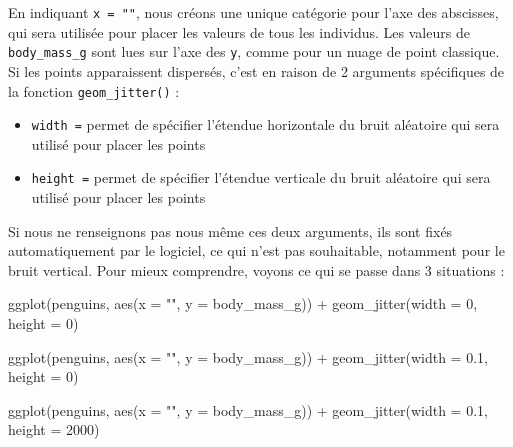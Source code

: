 \documentclass[
  a4paper,
  DIV=11,
  numbers=noendperiod,
  oneside]{scrreprt}
\newenvironment{Shaded}{}{}
\newcommand{\AttributeTok}[1]{\textcolor[rgb]{0.84,0.23,0.29}{#1}}
\newcommand{\DecValTok}[1]{\textcolor[rgb]{0.00,0.36,0.77}{#1}}
\newcommand{\FloatTok}[1]{\textcolor[rgb]{0.00,0.36,0.77}{#1}}
\newcommand{\FunctionTok}[1]{\textcolor[rgb]{0.44,0.26,0.76}{#1}}
\newcommand{\NormalTok}[1]{\textcolor[rgb]{0.14,0.16,0.18}{#1}}
\newcommand{\SpecialCharTok}[1]{\textcolor[rgb]{0.00,0.36,0.77}{#1}}
\newcommand{\StringTok}[1]{\textcolor[rgb]{0.01,0.18,0.38}{#1}}
\providecommand{\tightlist}{%
  \setlength{\itemsep}{0pt}\setlength{\parskip}{0pt}}\usepackage{longtable,booktabs,array}
\begin{document}
En indiquant \texttt{x\ =\ ""}, nous créons une unique catégorie pour
l'axe des abscisses, qui sera utilisée pour placer les valeurs de tous
les individus. Les valeurs de \texttt{body\_mass\_g} sont lues sur l'axe
des \texttt{y}, comme pour un nuage de point classique. Si les points
apparaissent dispersés, c'est en raison de 2 arguments spécifiques de la
fonction \texttt{geom\_jitter()} :

\begin{itemize}
\tightlist
\item
  \texttt{width\ =} permet de spécifier l'étendue horizontale du bruit
  aléatoire qui sera utilisé pour placer les points
\item
  \texttt{height\ =} permet de spécifier l'étendue verticale du bruit
  aléatoire qui sera utilisé pour placer les points
\end{itemize}

Si nous ne renseignons pas nous même ces deux arguments, ils sont fixés
automatiquement par le logiciel, ce qui n'est pas souhaitable, notamment
pour le bruit vertical. Pour mieux comprendre, voyons ce qui se passe
dans 3 situations :

\begin{Shaded}
\begin{Highlighting}[]
\FunctionTok{ggplot}\NormalTok{(penguins, }\FunctionTok{aes}\NormalTok{(}\AttributeTok{x =} \StringTok{""}\NormalTok{, }\AttributeTok{y =}\NormalTok{ body\_mass\_g)) }\SpecialCharTok{+}
  \FunctionTok{geom\_jitter}\NormalTok{(}\AttributeTok{width =} \DecValTok{0}\NormalTok{, }\AttributeTok{height =} \DecValTok{0}\NormalTok{)}

\FunctionTok{ggplot}\NormalTok{(penguins, }\FunctionTok{aes}\NormalTok{(}\AttributeTok{x =} \StringTok{""}\NormalTok{, }\AttributeTok{y =}\NormalTok{ body\_mass\_g)) }\SpecialCharTok{+}
  \FunctionTok{geom\_jitter}\NormalTok{(}\AttributeTok{width =} \FloatTok{0.1}\NormalTok{, }\AttributeTok{height =} \DecValTok{0}\NormalTok{)}

\FunctionTok{ggplot}\NormalTok{(penguins, }\FunctionTok{aes}\NormalTok{(}\AttributeTok{x =} \StringTok{""}\NormalTok{, }\AttributeTok{y =}\NormalTok{ body\_mass\_g)) }\SpecialCharTok{+}
  \FunctionTok{geom\_jitter}\NormalTok{(}\AttributeTok{width =} \FloatTok{0.1}\NormalTok{, }\AttributeTok{height =} \DecValTok{2000}\NormalTok{)}
\end{Highlighting}
\end{Shaded}
\end{document}
